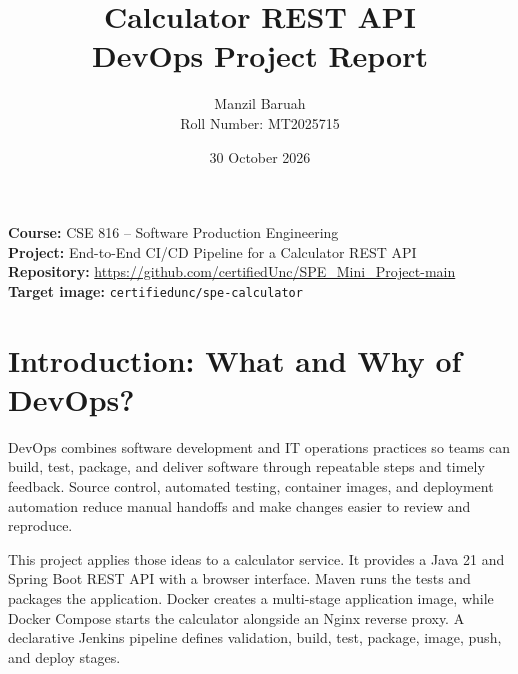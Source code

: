 \documentclass[11pt,a4paper]{article}
\title{\textbf{Calculator REST API\\DevOps Project Report}}
\author{Manzil Baruah\\Roll Number: MT2025715}
\date{30 October 2026}
\begin{document}
\maketitle
\begin{center}
\textbf{Course:} CSE 816 -- Software Production Engineering\\
\textbf{Project:} End-to-End CI/CD Pipeline for a Calculator REST API\\
\textbf{Repository:} \url{https://github.com/certifiedUnc/SPE_Mini_Project-main}\\
\textbf{Target image:} \texttt{certifiedunc/spe-calculator}
\end{center}

\section{Introduction: What and Why of DevOps?}
DevOps combines software development and IT operations practices so teams can build, test, package, and deliver software through repeatable steps and timely feedback. Source control, automated testing, container images, and deployment automation reduce manual handoffs and make changes easier to review and reproduce.

This project applies those ideas to a calculator service. It provides a Java 21 and Spring Boot REST API with a browser interface. Maven runs the tests and packages the application. Docker creates a multi-stage application image, while Docker Compose starts the calculator alongside an Nginx reverse proxy. A declarative Jenkins pipeline defines validation, build, test, package, image, push, and deploy stages.

\begin{center}
\end{center}
\end{document}
